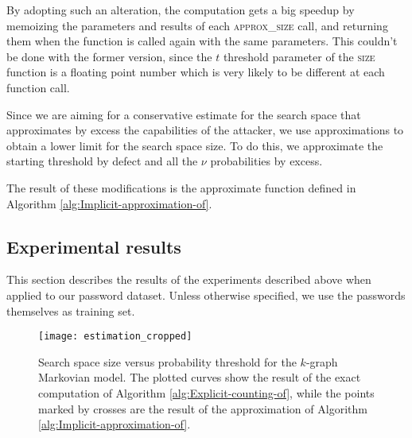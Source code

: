 \documentclass[a4paper,twocolumn]{article}
\providecommand{\tabularnewline}{\\}
\begin{document}
By adopting such an alteration, the computation gets a big speedup
by memoizing the parameters and results of each \textsc{approx\_size}
call, and returning them when the function is called again with the
same parameters. This couldn't be done with the former version, since
the $t$ threshold parameter of the \textsc{size} function is a floating
point number which is very likely to be different at each function
call. 

Since we are aiming for a conservative estimate for the search space
that approximates by excess the capabilities of the attacker, we use
approximations to obtain a lower limit for the search space size.
To do this, we approximate the starting threshold by defect and all
the $\nu$ probabilities by excess.

The result of these modifications is the approximate function defined
in Algorithm \ref{alg:Implicit-approximation-of}.


\subsection{\label{sub:Experimental-results}Experimental results}

This section describes the results of the experiments described above
when applied to our password dataset. Unless otherwise specified,
we use the passwords themselves as training set.

\begin{comment}
\begin{tabular}{|c|c|c|c|c|c|}
\hline 
 & 1 & 2 & 3 & 4 & 5\tabularnewline
\hline
\hline 
$10^{-3}$ & 1 (0\%) & 1 (0\%) & 1 (0\%) & 4 (0\%) & 5 (0\%)\tabularnewline
\hline 
$10^{-4}$ & 10 (0\%) & 8 (11.11\%) & 16 (5.88\%) & 59 (4.84\%) & 170 (9.57\%)\tabularnewline
\hline 
$10^{-5}$ & 38 (0\%) & 95 (2.06\%) & 496 (3.88\%) & 5,739 (3.06\%) & 19,005 (0.88\%)\tabularnewline
\hline 
$10^{-6}$ & 1,322 (3.71\%) & 5,070 (4.70\%) & 21,493 (5.48\%) & 107,103 (4.27\%) & 85,238 (1.75\%)\tabularnewline
\hline 
$10^{-7}$ & 47,988 (4.95\%) & 203,071 (5.47\%) & 530,469 (5.09\%) & 904,545 (3.78\%) & 215,193 (1.94\%)\tabularnewline
\hline 
$10^{-8}$ & 1,060,785 (5.42\%) & 4,069,913 (4.46\%) & 7,540,827 (4.35\%) & 5,478,552 (3.73\%) & 537,687 (2.10\%)\tabularnewline
\hline
\end{tabular}
\end{comment}
{}

\begin{figure}
\begin{centering}
\texttt{[image: estimation\_cropped]}
\par\end{centering}

\caption{\label{fig:Estimation-of-search}Search space size versus probability
threshold for the $k$-graph Markovian model. The plotted curves show
the result of the exact computation of Algorithm \ref{alg:Explicit-counting-of},
while the points marked by crosses are the result of the approximation
of Algorithm \ref{alg:Implicit-approximation-of}.}

\end{figure}
\end{document}
